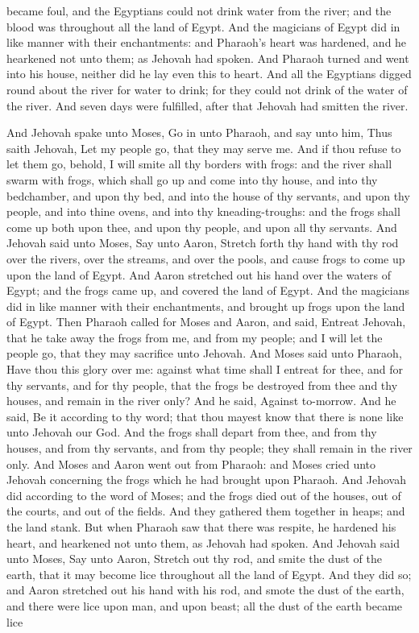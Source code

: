 became foul, and the Egyptians could not drink water from the river; and the blood was throughout all the land of Egypt. And the magicians of Egypt did in like manner with their enchantments: and Pharaoh’s heart was hardened, and he hearkened not unto them; as Jehovah had spoken. And Pharaoh turned and went into his house, neither did he lay even this to heart. And all the Egyptians digged round about the river for water to drink; for they could not drink of the water of the river. And seven days were fulfilled, after that Jehovah had smitten the river. 

And Jehovah spake unto Moses, Go in unto Pharaoh, and say unto him, Thus saith Jehovah, Let my people go, that they may serve me. And if thou refuse to let them go, behold, I will smite all thy borders with frogs: and the river shall swarm with frogs, which shall go up and come into thy house, and into thy bedchamber, and upon thy bed, and into the house of thy servants, and upon thy people, and into thine ovens, and into thy kneading-troughs: and the frogs shall come up both upon thee, and upon thy people, and upon all thy servants. And Jehovah said unto Moses, Say unto Aaron, Stretch forth thy hand with thy rod over the rivers, over the streams, and over the pools, and cause frogs to come up upon the land of Egypt. And Aaron stretched out his hand over the waters of Egypt; and the frogs came up, and covered the land of Egypt. And the magicians did in like manner with their enchantments, and brought up frogs upon the land of Egypt.  Then Pharaoh called for Moses and Aaron, and said, Entreat Jehovah, that he take away the frogs from me, and from my people; and I will let the people go, that they may sacrifice unto Jehovah. And Moses said unto Pharaoh, Have thou this glory over me: against what time shall I entreat for thee, and for thy servants, and for thy people, that the frogs be destroyed from thee and thy houses, and remain in the river only? And he said, Against to-morrow. And he said, Be it according to thy word; that thou mayest know that there is none like unto Jehovah our God. And the frogs shall depart from thee, and from thy houses, and from thy servants, and from thy people; they shall remain in the river only. And Moses and Aaron went out from Pharaoh: and Moses cried unto Jehovah concerning the frogs which he had brought upon Pharaoh. And Jehovah did according to the word of Moses; and the frogs died out of the houses, out of the courts, and out of the fields. And they gathered them together in heaps; and the land stank. But when Pharaoh saw that there was respite, he hardened his heart, and hearkened not unto them, as Jehovah had spoken.  And Jehovah said unto Moses, Say unto Aaron, Stretch out thy rod, and smite the dust of the earth, that it may become lice throughout all the land of Egypt. And they did so; and Aaron stretched out his hand with his rod, and smote the dust of the earth, and there were lice upon man, and upon beast; all the dust of the earth became lice 